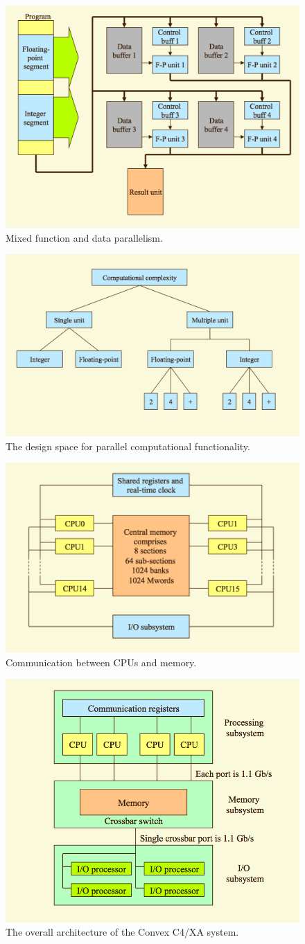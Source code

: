 \begin{figure}
\centering
\includegraphics[width=0.5\linewidth]{figures/screenshot090}
\caption{Mixed function and data parallelism.}
\label{fig:screenshot090}
\end{figure}

\begin{figure}
\centering
\includegraphics[width=0.5\linewidth]{figures/screenshot091}
\caption{The design space for parallel computational functionality.}
\label{fig:screenshot091}
\end{figure}

\begin{figure}
\centering
\includegraphics[width=0.5\linewidth]{figures/screenshot092}
\caption{Communication between CPUs and memory.}
\label{fig:screenshot092}
\end{figure}

\begin{figure}
\centering
\includegraphics[width=0.5\linewidth]{figures/screenshot093}
\caption{The overall architecture of the Convex C4/XA system.}
\label{fig:screenshot093}
\end{figure}

